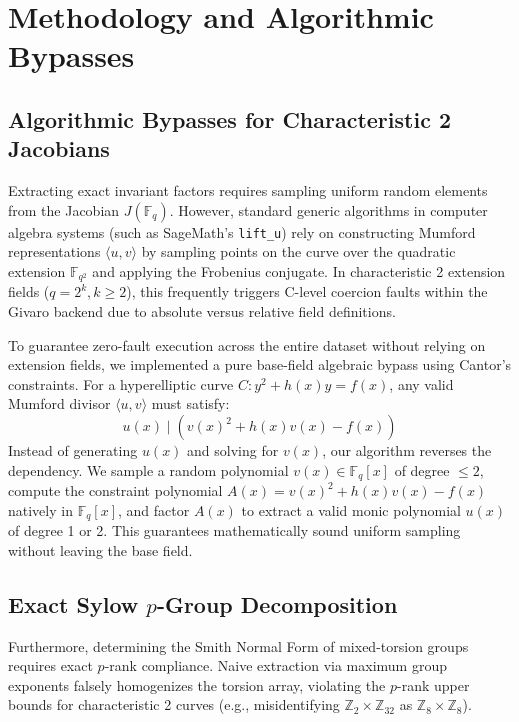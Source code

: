 \documentclass[letterpaper, 11pt]{article}
\begin{document}
\section{Methodology and Algorithmic Bypasses}

\subsection{Algorithmic Bypasses for Characteristic 2 Jacobians}
Extracting exact invariant factors requires sampling uniform random elements from the Jacobian $J(\mathbb{F}_q)$. However, standard generic algorithms in computer algebra systems (such as SageMath's \texttt{lift\_u}) rely on constructing Mumford representations $\langle u, v \rangle$ by sampling points on the curve over the quadratic extension $\mathbb{F}_{q^2}$ and applying the Frobenius conjugate. In characteristic 2 extension fields ($q = 2^k, k \ge 2$), this frequently triggers C-level coercion faults within the Givaro backend due to absolute versus relative field definitions.

To guarantee zero-fault execution across the entire dataset without relying on extension fields, we implemented a pure base-field algebraic bypass using Cantor's constraints. For a hyperelliptic curve $C: y^2 + h(x)y = f(x)$, any valid Mumford divisor $\langle u, v \rangle$ must satisfy:
\begin{equation}
    u(x) \mid \left( v(x)^2 + h(x)v(x) - f(x) \right)
\end{equation}
Instead of generating $u(x)$ and solving for $v(x)$, our algorithm reverses the dependency. We sample a random polynomial $v(x) \in \mathbb{F}_q[x]$ of degree $\le 2$, compute the constraint polynomial $A(x) = v(x)^2 + h(x)v(x) - f(x)$ natively in $\mathbb{F}_q[x]$, and factor $A(x)$ to extract a valid monic polynomial $u(x)$ of degree 1 or 2. This guarantees mathematically sound uniform sampling without leaving the base field.

\subsection{Exact Sylow $p$-Group Decomposition}
Furthermore, determining the Smith Normal Form of mixed-torsion groups requires exact $p$-rank compliance. Naive extraction via maximum group exponents falsely homogenizes the torsion array, violating the $p$-rank upper bounds for characteristic 2 curves (e.g., misidentifying $\mathbb{Z}_2 \times \mathbb{Z}_{32}$ as $\mathbb{Z}_8 \times \mathbb{Z}_8$). 
\end{document}
